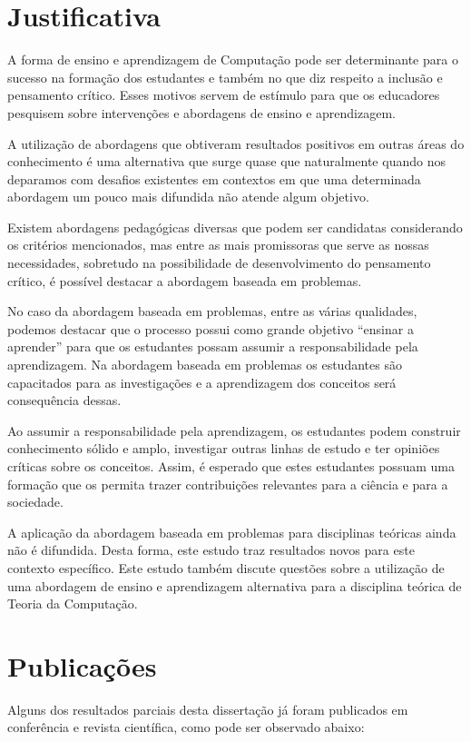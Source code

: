 \section{Justificativa}
A forma de ensino e aprendizagem de Computação pode
ser determinante para o sucesso na formação dos
estudantes e também no que diz respeito a inclusão
e pensamento crítico.
Esses motivos servem de estímulo
para que os educadores pesquisem sobre intervenções e
abordagens de ensino e aprendizagem.

A utilização de abordagens que obtiveram
resultados positivos em outras áreas do conhecimento é uma
alternativa que surge quase que naturalmente quando
nos deparamos com desafios existentes em contextos
em que uma determinada abordagem um pouco mais difundida
não atende algum objetivo.

Existem abordagens pedagógicas diversas que podem
ser candidatas considerando os critérios mencionados,
mas entre as mais promissoras que serve
as nossas necessidades, sobretudo na possibilidade
de desenvolvimento do pensamento crítico, é possível
destacar a abordagem baseada em problemas.

No caso da abordagem baseada em problemas, entre as
várias qualidades, podemos destacar que o processo
possui como grande objetivo ``ensinar a aprender'' para
que os estudantes possam assumir a
responsabilidade pela aprendizagem.
Na abordagem baseada em problemas os estudantes
são capacitados para as investigações e a aprendizagem
dos conceitos será consequência dessas.

Ao assumir a responsabilidade pela aprendizagem, os
estudantes podem construir conhecimento sólido
e amplo, investigar outras linhas de estudo e ter opiniões
críticas sobre os conceitos.
Assim, é esperado que estes estudantes possuam uma
formação que os permita trazer contribuições
relevantes para a ciência e para a sociedade.

A aplicação da abordagem baseada em problemas
para disciplinas teóricas ainda não é difundida.
Desta forma, este estudo traz resultados novos para
este contexto específico.
Este estudo também discute questões sobre a utilização
de uma abordagem de ensino e aprendizagem alternativa
para a disciplina teórica de Teoria da Computação.

\section{Publicações}
\label{sec-publicacoes}
Alguns dos resultados parciais desta dissertação já
foram publicados em conferência e revista científica,
como pode ser observado abaixo:
\begin{itemize}

\end{itemize}

